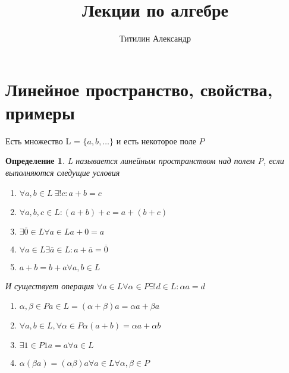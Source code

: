 \documentclass{scrartcl}
\title{Лекции по алгебре}
\author{Титилин Александр}
\date{}
\newtheorem{definition}{Определение}
\begin{document}
    \maketitle
    \section{Линейное пространство, свойства, примеры}
    Есть множество L = $\{a,b,\dots\}$ и есть некоторое поле  $P$
    \begin{definition}
        L называется линейным пространством над полем P, если выполняются следущие условия
        \begin{enumerate}
            \item $\forall a,b \in L ~ \exists ! c : a + b = c$
            \item $\forall a,b,c \in L : (a + b) + c = a + (b + c)$
             \item $\exists  \overline{0} \in L \forall  a \in L a + 0 = a$
             \item $\forall  a\in L \exists  \overline{a} \in L : a +  \overline{a} = \overline{0}$
             \item $a + b = b + a \forall  a,b \in L$
        \end{enumerate}
        И существует операция $\forall  a\in L \forall  \alpha \in P \exists ! d \in L : \alpha a = d$
        \begin{enumerate}
            \item $\alpha , \beta \in  P a \in L = (\alpha + \beta)a = \alpha a + \beta a$
            \item  $\forall  a,b \in L , \forall \alpha \in P \alpha(a + b) = \alpha a + \alpha b $
            \item $\exists  1 \in P 1a = a \forall a \in L$
            \item $\alpha(\beta a) = (\alpha \beta)a \forall a \in L \forall \alpha ,\beta \in P $
        \end{enumerate}
    \end{definition}
\end{document}
